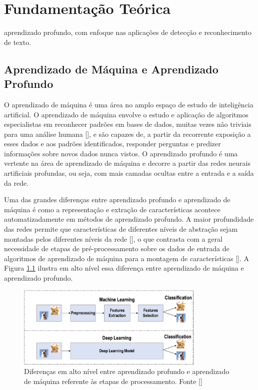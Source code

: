 \chapter{Fundamentação Teórica}

aprendizado profundo, com enfoque nas aplicações de detecção e reconhecimento de texto.

\section{Aprendizado de Máquina e Aprendizado Profundo}
O aprendizado de máquina é uma área no amplo espaço de estudo de inteligência artificial. O aprendizado de máquina 
envolve o estudo e aplicação de algoritmos especialistas em reconhecer padrões em bases de dados, muitas vezes não 
triviais para uma análise humana [], e são capazes de, a partir da recorrente exposição a 
esses dados e aos padrões identificados, responder perguntas e predizer informações sobre novos dados nunca vistos. 
O aprendizado profundo é uma vertente na área de aprendizado de máquina e decorre a partir das redes neurais artificiais 
profundas, ou seja, com mais camadas ocultas entre a entrada e a saída da rede.

Uma das grandes diferenças entre aprendizado profundo e aprendizado de máquina é como a representação e extração de 
características acontece automatizadamente em métodos de aprendizado profundo. A maior profundidade das redes permite 
que características de diferentes níveis de abstração sejam montadas pelos diferentes níveis da rede 
[], o que contrasta com a geral necessidade de etapas de pré-processamento sobre os 
dados de entrada de algoritmos de aprendizado de máquina para a montagem de características []. 
A Figura \ref{fig:dl_vs_ml} ilustra em alto nível essa diferença entre aprendizado de máquina e aprendizado profundo.

\begin{figure}
    \centering
    \includegraphics[width=0.8\textwidth]{figs/theory-ml-vs-dl.png}
    \caption{Diferenças em alto nível entre aprendizado profundo e aprendizado de máquina referente às etapas de processamento. Fonte []}
    \label{fig:dl_vs_ml}
\end{figure}

